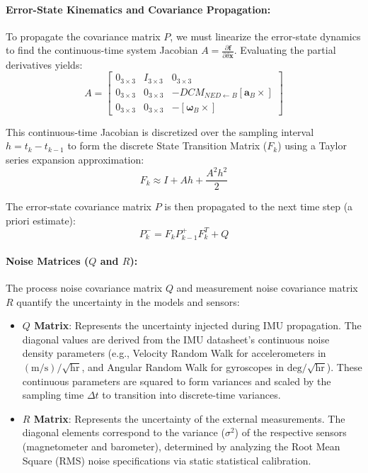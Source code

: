 \documentclass[11pt, a4paper]{article} %
\begin{document}
\paragraph{Error-State Kinematics and Covariance Propagation:}
To propagate the covariance matrix $P$, we must linearize the error-state dynamics to find the continuous-time system Jacobian $A = \frac{\partial \mathbf{f}}{\partial \delta\mathbf{x}}$. Evaluating the partial derivatives yields:
\[
A = \begin{bmatrix} 
0_{3\times3} & I_{3\times3} & 0_{3\times3} \\ 
0_{3\times3} & 0_{3\times3} & -DCM_{NED \leftarrow B} [\mathbf{a}_B \times] \\ 
0_{3\times3} & 0_{3\times3} & -[\boldsymbol{\omega}_B \times] 
\end{bmatrix}
\]

This continuous-time Jacobian is discretized over the sampling interval $h = t_k - t_{k-1}$ to form the discrete State Transition Matrix ($F_k$) using a Taylor series expansion approximation:
\[
F_k \approx I + A h + \frac{A^2 h^2}{2}
\]

The error-state covariance matrix $P$ is then propagated to the next time step (a priori estimate):
\[
P_k^- = F_k P_{k-1}^+ F_k^T + Q
\]

\paragraph{Noise Matrices ($Q$ and $R$):}
The process noise covariance matrix $Q$ and measurement noise covariance matrix $R$ quantify the uncertainty in the models and sensors:
\begin{itemize}
    \item \textbf{$Q$ Matrix}: Represents the uncertainty injected during IMU propagation. The diagonal values are derived from the IMU datasheet's continuous noise density parameters (e.g., Velocity Random Walk for accelerometers in $(\text{m/s})/\sqrt{\text{hr}}$, and Angular Random Walk for gyroscopes in $\text{deg}/\sqrt{\text{hr}}$). These continuous parameters are squared to form variances and scaled by the sampling time $\Delta t$ to transition into discrete-time variances.
    \item \textbf{$R$ Matrix}: Represents the uncertainty of the external measurements. The diagonal elements correspond to the variance ($\sigma^2$) of the respective sensors (magnetometer and barometer), determined by analyzing the Root Mean Square (RMS) noise specifications via static statistical calibration.
\end{itemize}
\end{document}
